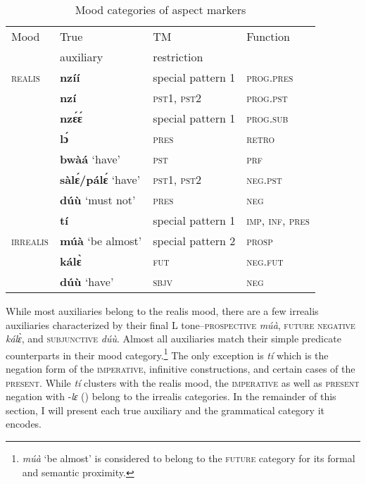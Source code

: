\begin{table}[!h]
\centering
\begin{tabular}{p{3cm}|lll}
 \midrule
Mood               & True  & TM           & Function \\
                       &  auxiliary   & restriction &            \\
 \midrule
\textsc{realis}  &  {\bfseries nzíí} & special pattern 1 & \textsc{prog.pres} \\
                       & {\bfseries nzí} & \textsc{pst1, pst2} & \textsc{prog.pst} \\
                       & {\bfseries nzɛ́ɛ́} & special pattern 1 & \textsc{prog.sub} \\
                       &   {\bfseries lɔ́} & \textsc{pres} & \textsc{retro} \\
                       & {\bfseries bwàá} `have' & \textsc{pst} & \textsc{prf}\\ 
                       & {\bfseries sàlɛ́/pálɛ́} `have' & \textsc{pst1, pst2} & \textsc{neg.pst}\\ 
                       & {\bfseries dúù} `must not' & \textsc{pres} & \textsc{neg}\\ 
                       & {\bfseries tí}  & special pattern 1 & \textsc{imp, inf, pres}\\ 
  \midrule
\textsc{irrealis} & {\bfseries múà} `be almost'  &  special pattern 2 & \textsc{prosp}   \\ 
                       & {\bfseries kálɛ̀} & \textsc{fut} & \textsc{neg.fut}\\ 
                       & {\bfseries dúù} `have' & \textsc{sbjv} & \textsc{neg}\\ 
 \midrule 
\end{tabular}
\caption{Mood categories of aspect markers}
\label{Tab:AM}
\end{table} 

While most auxiliaries belong to the realis mood, there are a few irrealis auxiliaries characterized by their final L tone--\textsc{prospective} {\itshape múà}, \textsc{future negative} {\itshape kálɛ̀}, and \textsc{subjunctive} {\itshape dúù}. Almost all auxiliaries match their simple predicate counterparts in their mood category.\footnote{{\itshape múà} `be almost' is considered to belong to the \textsc{future} category for its formal and semantic proximity.} The only exception is {\itshape tí} which is the negation form of the \textsc{imperative}, infinitive constructions, and certain cases of the \textsc{present}. While {\itshape tí} clusters with the realis mood, the \textsc{imperative} as well as \textsc{present} negation with -{\itshape lɛ} () belong to the irrealis categories. 
In the remainder of this section, I will present each true auxiliary and the grammatical category it encodes.





